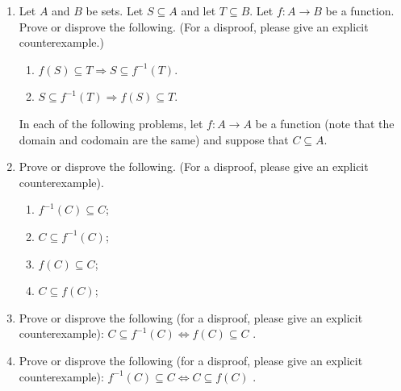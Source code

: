 \begin{enumerate}
\item Let $A$ and $B$ be sets. Let $S \subseteq A$ and let $T \subseteq B$. Let $f\colon A \to B$ be a function. Prove or disprove the following. (For a disproof, please give an explicit counterexample.)
 \begin{enumerate}
 \item $f(S) \subseteq T \Rightarrow S \subseteq f^{-1}(T)$.
 \item $S \subseteq f^{-1}(T) \Rightarrow f(S) \subseteq T$.
 \end{enumerate}

\newpage
 In each of the following problems, let $f\colon A \to A$ be a function (note that the domain and codomain are the same) and suppose that $C \subseteq A$.
 
\item  Prove or disprove the following. (For a disproof, please give an explicit counterexample).
 \begin{enumerate}
 \item $f^{-1}(C)\subseteq  C$;
 \item $C\subseteq  f^{-1}(C)$;
 \item $f(C)\subseteq  C$;
 \item $C\subseteq  f(C)$;
 \end{enumerate}
 


\item Prove or disprove the following (for a disproof, please give an explicit counterexample): $C \subseteq  f^{-1}(C) \iff f(C)\subseteq  C$ . 

\item Prove or disprove the following (for a disproof, please give an explicit counterexample): $f^{-1}(C)\subseteq  C \iff C\subseteq  f(C)$ .


  
\end{enumerate}


